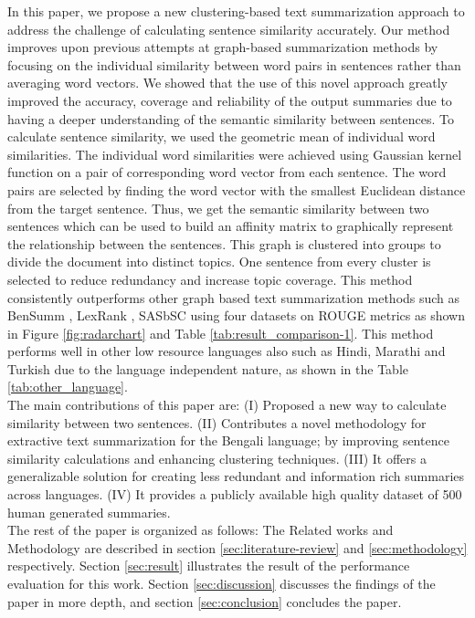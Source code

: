 \documentclass[acmlarge]{acmart}
\begin{document}
In this paper, we propose a new clustering-based text summarization approach to address the challenge of calculating sentence similarity accurately. Our method improves upon previous attempts at graph-based summarization methods \cite{chowdhury-etal-2021-tfidf-clustering, roychowdhury-etal-2022-spectral-base} by focusing on the individual similarity between word pairs in sentences rather than averaging word vectors. We showed that the use of this novel approach greatly improved the accuracy, coverage and reliability of the output summaries due to having a deeper understanding of the semantic similarity between sentences. To calculate sentence similarity, we used the geometric mean of individual word similarities. The individual word similarities were achieved using Gaussian kernel function on a pair of corresponding word vector from each sentence. The word pairs are selected by finding the word vector with the smallest Euclidean distance from the target sentence. Thus, we get the semantic similarity between two sentences which can be used to build an affinity matrix to graphically represent the relationship between the sentences. This graph is clustered into groups to divide the document into distinct topics. One sentence from every cluster is selected to reduce redundancy and increase topic coverage. This method consistently outperforms other graph based text summarization methods such as BenSumm \cite{chowdhury-etal-2021-tfidf-clustering}, LexRank \cite{Erkan-lexRank-2004}, SASbSC \cite{roychowdhury-etal-2022-spectral-base} using four datasets on ROUGE metrics \cite{lin-2004-rouge} as shown in Figure \ref{fig:radarchart} and Table \ref{tab:result_comparison-1}. This method performs well in other low resource languages also such as Hindi, Marathi and Turkish due to the language independent nature, as shown in the Table \ref{tab:other_language}.\\

The main contributions of this paper are:
(I) Proposed a new way to calculate similarity between two sentences.
(II) Contributes a novel methodology for extractive text summarization for the Bengali language; by improving sentence similarity calculations and enhancing clustering techniques.
(III) It offers a generalizable solution for creating less redundant and information rich summaries across languages.
(IV) It provides a publicly available high quality dataset of 500 human generated summaries.\\

The rest of the paper is organized as follows: The Related works and Methodology are described in section \ref{sec:literature-review} and \ref{sec:methodology} respectively. Section \ref{sec:result} illustrates the result of the performance evaluation for this work. Section \ref{sec:discussion} discusses the findings of the paper in more depth, and section \ref{sec:conclusion} concludes the paper.
\end{document}
